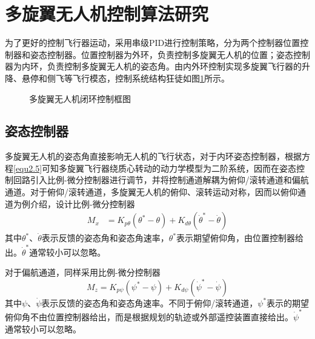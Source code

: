 \section{多旋翼无人机控制算法研究}
为了更好的控制飞行器运动，采用串级PID进行控制策略，分为两个控制器位置控制器和姿态控制器。位置控制器为外环，负责控制多旋翼无人机的位置；姿态控制器为内环，负责控制多旋翼无人机的姿态角。由内外环控制实现多旋翼飞行器的升降、悬停和侧飞等飞行模态，控制系统结构狂徒如图\ref{fig2.3}所示。
\begin{figure}
\centering
\caption{多旋翼无人机闭环控制框图}
\label{fig2.3}
\end{figure}

\subsection{姿态控制器}
多旋翼无人机的姿态角直接影响无人机的飞行状态，对于内环姿态控制器，根据方程\eqref{equ2.5}可知多旋翼飞行器绕质心转动的动力学模型为二阶系统，因而在姿态控制回路引入比例-微分控制器进行调节，并将控制通道解耦为俯仰/滚转通道和偏航通道。对于俯仰/滚转通道，多旋翼无人机的俯仰、滚转运动对称，因而以俯仰通道为例介绍，设计比例-微分控制器
\begin{equation}
\label{equ2.12}
\begin{aligned}
M_x &= K_{p\theta} \left( \theta^* - \theta \right) + K_{d\theta} \left( \dot{\theta}^* -  \dot{\theta} \right)
\end{aligned}
\end{equation}
其中$\theta^*$、$\dot{\theta}$表示反馈的姿态角和姿态角速率，$\theta^*$表示期望俯仰角，由位置控制器给出。$ \dot{\theta}^*$通常较小可以忽略。

对于偏航通道，同样采用比例-微分控制器
\begin{equation}
\label{equ2.13}
M_z = K_{p\psi} \left( \psi^* - \psi \right) + K_{d\psi} \left( \dot{\psi}^* -  \dot{\psi} \right)
\end{equation}
其中$\psi$、$\dot{\psi}$表示反馈的姿态角和姿态角速率。不同于俯仰/滚转通道，$\psi^*$表示的期望俯仰角不由位置控制器给出，而是根据规划的轨迹或外部遥控装置直接给出。$ \dot{\psi}^*$通常较小可以忽略。

